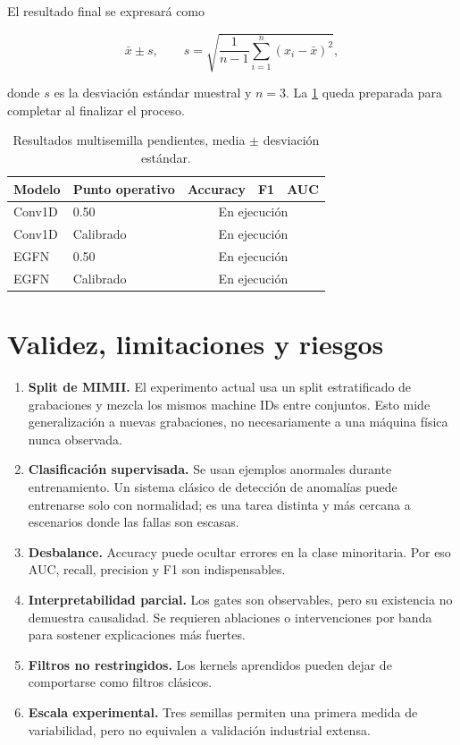 \documentclass[11pt,a4paper]{article}
\begin{document}
El resultado final se expresará como

\begin{equation}
\bar{x} \pm s,
\qquad
s=\sqrt{\frac{1}{n-1}\sum_{i=1}^{n}(x_i-\bar{x})^2},
\end{equation}

donde \(s\) es la desviación estándar muestral y \(n=3\). La
\cref{tab:multiseed} queda preparada para completar al finalizar el proceso.

\begin{table}[ht]
\centering
\caption{Resultados multisemilla pendientes, media \(\pm\) desviación estándar.}
\label{tab:multiseed}
\begin{tabular}{llccc}
\toprule
Modelo & Punto operativo & Accuracy & F1 & AUC \\
\midrule
Conv1D & 0.50 & \multicolumn{3}{c}{En ejecución} \\
Conv1D & Calibrado & \multicolumn{3}{c}{En ejecución} \\
EGFN & 0.50 & \multicolumn{3}{c}{En ejecución} \\
EGFN & Calibrado & \multicolumn{3}{c}{En ejecución} \\
\bottomrule
\end{tabular}
\end{table}

\section{Validez, limitaciones y riesgos}

\begin{enumerate}
  \item \textbf{Split de MIMII.} El experimento actual usa un split estratificado
  de grabaciones y mezcla los mismos machine IDs entre conjuntos. Esto mide
  generalización a nuevas grabaciones, no necesariamente a una máquina física
  nunca observada.
  \item \textbf{Clasificación supervisada.} Se usan ejemplos anormales durante
  entrenamiento. Un sistema clásico de detección de anomalías puede entrenarse
  solo con normalidad; es una tarea distinta y más cercana a escenarios donde
  las fallas son escasas.
  \item \textbf{Desbalance.} Accuracy puede ocultar errores en la clase
  minoritaria. Por eso AUC, recall, precision y F1 son indispensables.
  \item \textbf{Interpretabilidad parcial.} Los gates son observables, pero su
  existencia no demuestra causalidad. Se requieren ablaciones o intervenciones
  por banda para sostener explicaciones más fuertes.
  \item \textbf{Filtros no restringidos.} Los kernels aprendidos pueden dejar de
  comportarse como filtros clásicos.
  \item \textbf{Escala experimental.} Tres semillas permiten una primera medida
  de variabilidad, pero no equivalen a validación industrial extensa.
\end{enumerate}
\end{document}
